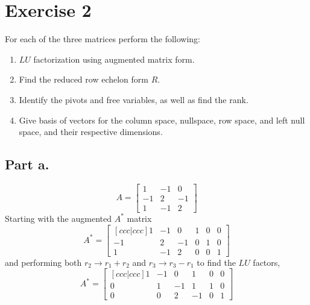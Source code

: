 \section{Exercise 2}
For each of the three matrices perform the following:
\begin{enumerate}[label=(\alph*)]
    \item $LU$ factorization using augmented matrix form.
    \item Find the reduced row echelon form $R$.
    \item Identify the pivots and free variables, as well as find the rank.
    \item Give basis of vectors for the column space, nullspace, row space,
        and left null space, and their respective dimensions.
\end{enumerate}
\subsection{Part a.}
\begin{equation}
    A =
    \begin{bmatrix}
        1       &   -1  &   0    \\
        -1      &   2   &   -1   \\
        1       &   -1  &   2
    \end{bmatrix}
\end{equation}
Starting with the augmented $A^{\ast}$ matrix
\begin{equation}
    A^{\ast} =
    \begin{bmatrix}[ccc|ccc]
        1       &   -1  &   0   &   1   &   0   &   0   \\
        -1      &   2   &   -1  &   0   &   1   &   0   \\
        1       &   -1  &   2   &   0   &   0   &   1
    \end{bmatrix}
\end{equation}
and performing both $r_{2}\rightarrow r_{1} + r_{2}$ and $r_{3}\rightarrow
r_{3}-r_{1}$ to find the $LU$ factors,   
\begin{equation}
    A^{\ast} =
    \begin{bmatrix}[ccc|ccc]
        1       &   -1  &   0   &   1   &   0   &   0   \\
        0       &   1   &   -1  &   1   &   1   &   0   \\
        0       &   0   &   2   &   -1   &   0   &   1
    \end{bmatrix}
\end{equation}
